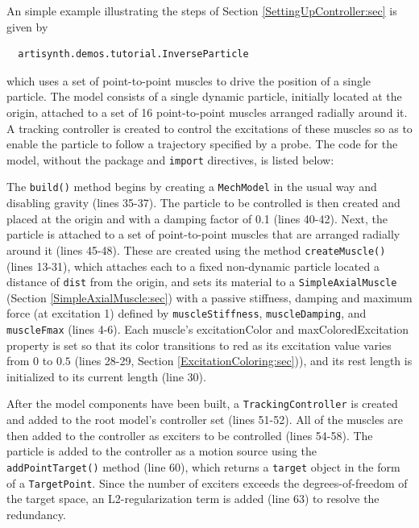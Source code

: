 An simple example illustrating the steps of
Section \ref{SettingUpController:sec} is given by
%
\begin{verbatim}
  artisynth.demos.tutorial.InverseParticle
\end{verbatim}
%
which uses a set of point-to-point muscles to drive the position of a single
particle. The model consists of a single dynamic particle, initially located at
the origin, attached to a set of 16 point-to-point muscles arranged radially
around it. A tracking controller is created to control the excitations of these
muscles so as to enable the particle to follow a trajectory specified by a
probe. The code for the model, without the package and {\tt import} directives, is
listed below:
%
\lstset{numbers=left}
\iflatexml

\else

\fi
\lstset{numbers=none}
%

The {\tt build()} method begins by creating a {\tt MechModel} in the usual way
and disabling gravity (lines 35-37). The particle to be controlled is then
created and placed at the origin and with a damping factor of 0.1 (lines
40-42). Next, the particle is attached to a set of point-to-point muscles that
are arranged radially around it (lines 45-48). These are created using the
method {\tt createMuscle()} (lines 13-31), which attaches each to a fixed
non-dynamic particle located a distance of {\tt dist} from the origin, and sets
its material to a {\tt SimpleAxialMuscle} (Section \ref{SimpleAxialMuscle:sec})
with a passive stiffness, damping and maximum force (at excitation 1) defined
by {\tt muscleStiffness}, {\tt muscleDamping}, and {\tt muscleFmax} (lines
4-6). Each muscle's {\sf excitationColor} and {\sf maxColoredExcitation}
property is set so that its color transitions to red as its excitation value
varies from $0$ to $0.5$ (lines 28-29, Section \ref{ExcitationColoring:sec})),
and its rest length is initialized to its current length (line 30).

After the model components have been built, a {\tt TrackingController} is
created and added to the root model's controller set (lines 51-52).  All of the
muscles are then added to the controller as exciters to be controlled (lines
54-58). The particle is added to the controller as a motion source using the
{\tt addPointTarget()} method (line 60), which returns a {\tt target} object
in the form of a {\tt TargetPoint}. Since the number of exciters exceeds the
degrees-of-freedom of the target space, an L2-regularization term is added
(line 63) to resolve the redundancy.

